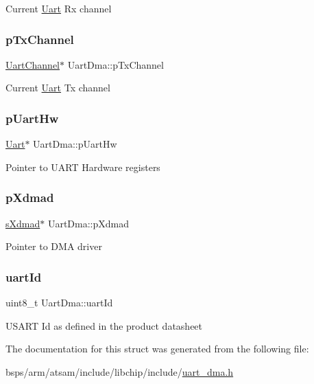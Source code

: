 Current \mbox{\hyperlink{structUart}{Uart}} Rx channel \mbox{\label{structUartDma_a7f0497429070ce75403395c6b6e6a31b}} 
\subsubsection{\texorpdfstring{pTxChannel}{pTxChannel}}
{\footnotesize\ttfamily \mbox{\hyperlink{structUartChannel}{Uart\+Channel}}$\ast$ Uart\+Dma\+::p\+Tx\+Channel}

Current \mbox{\hyperlink{structUart}{Uart}} Tx channel \mbox{\label{structUartDma_a78da94bb981cda7cb36a738868326e77}} 
\subsubsection{\texorpdfstring{pUartHw}{pUartHw}}
{\footnotesize\ttfamily \mbox{\hyperlink{structUart}{Uart}}$\ast$ Uart\+Dma\+::p\+Uart\+Hw}

Pointer to U\+A\+RT Hardware registers \mbox{\label{structUartDma_aa9d4edd1ae2284162ab7ab1d199f3cf3}} 
\subsubsection{\texorpdfstring{pXdmad}{pXdmad}}
{\footnotesize\ttfamily \mbox{\hyperlink{group__dmad__structs_gaf2c13151514615a6beb35c0d868a5053}{s\+Xdmad}}$\ast$ Uart\+Dma\+::p\+Xdmad}

Pointer to D\+MA driver \mbox{\label{structUartDma_aeec7e45717b2903b4cb2c1cfa6f3855f}} 
\subsubsection{\texorpdfstring{uartId}{uartId}}
{\footnotesize\ttfamily uint8\+\_\+t Uart\+Dma\+::uart\+Id}

U\+S\+A\+RT Id as defined in the product datasheet 

The documentation for this struct was generated from the following file\+:\begin{DoxyCompactItemize}
\item 
bsps/arm/atsam/include/libchip/include/\mbox{\hyperlink{uart__dma_8h}{uart\+\_\+dma.\+h}}\end{DoxyCompactItemize}
